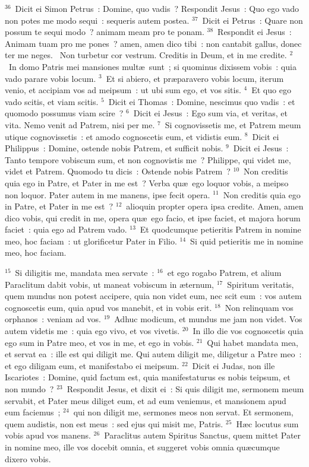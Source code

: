 ${}^{36}$~Dicit ei Simon Petrus~: Domine, quo vadis~? Respondit Jesus~: Quo ego vado non potes me modo sequi~: sequeris autem postea.
${}^{37}$~Dicit ei Petrus~: Quare non possum te sequi modo~? animam meam pro te ponam.
${}^{38}$~Respondit ei Jesus~: Animam tuam pro me pones~? amen, amen dico tibi~: non cantabit gallus, donec ter me neges.
~Non turbetur cor vestrum. Creditis in Deum, et in me credite.
${}^{2}$~In domo Patris mei mansiones mult\ae\ sunt~; si quominus dixissem vobis~: quia vado parare vobis locum.
${}^{3}$~Et si abiero, et pr\ae paravero vobis locum, iterum venio, et accipiam vos ad meipsum~: ut ubi sum ego, et vos sitis.
${}^{4}$~Et quo ego vado scitis, et viam scitis.
${}^{5}$~Dicit ei Thomas~: Domine, nescimus quo vadis~: et quomodo possumus viam scire~?
${}^{6}$~Dicit ei Jesus~: Ego sum via, et veritas, et vita. Nemo venit ad Patrem, nisi per me.
${}^{7}$~Si cognovissetis me, et Patrem meum utique cognovissetis~: et amodo cognoscetis eum, et vidistis eum.
${}^{8}$~Dicit ei Philippus~: Domine, ostende nobis Patrem, et sufficit nobis.
${}^{9}$~Dicit ei Jesus~: Tanto tempore vobiscum sum, et non cognovistis me~? Philippe, qui videt me, videt et Patrem. Quomodo tu dicis~: Ostende nobis Patrem~?
${}^{10}$~Non creditis quia ego in Patre, et Pater in me est~? Verba qu\ae\ ego loquor vobis, a meipso non loquor. Pater autem in me manens, ipse fecit opera.
${}^{11}$~Non creditis quia ego in Patre, et Pater in me est~?
${}^{12}$~alioquin propter opera ipsa credite. Amen, amen dico vobis, qui credit in me, opera qu\ae\ ego facio, et ipse faciet, et majora horum faciet~: quia ego ad Patrem vado.
${}^{13}$~Et quodcumque petieritis Patrem in nomine meo, hoc faciam~: ut glorificetur Pater in Filio.
${}^{14}$~Si quid petieritis me in nomine meo, hoc faciam.


${}^{15}$~Si diligitis me, mandata mea servate~:
${}^{16}$~et ego rogabo Patrem, et alium Paraclitum dabit vobis, ut maneat vobiscum in \ae ternum,
${}^{17}$~Spiritum veritatis, quem mundus non potest accipere, quia non videt eum, nec scit eum~: vos autem cognoscetis eum, quia apud vos manebit, et in vobis erit.
${}^{18}$~Non relinquam vos orphanos~: veniam ad vos.
${}^{19}$~Adhuc modicum, et mundus me jam non videt. Vos autem videtis me~: quia ego vivo, et vos vivetis.
${}^{20}$~In illo die vos cognoscetis quia ego sum in Patre meo, et vos in me, et ego in vobis.
${}^{21}$~Qui habet mandata mea, et servat ea~: ille est qui diligit me. Qui autem diligit me, diligetur a Patre meo~: et ego diligam eum, et manifestabo ei meipsum.
${}^{22}$~Dicit ei Judas, non ille Iscariotes~: Domine, quid factum est, quia manifestaturus es nobis teipsum, et non mundo~?
${}^{23}$~Respondit Jesus, et dixit ei~: Si quis diligit me, sermonem meum servabit, et Pater meus diliget eum, et ad eum veniemus, et mansionem apud eum faciemus~;
${}^{24}$~qui non diligit me, sermones meos non servat. Et sermonem, quem audistis, non est meus~: sed ejus qui misit me, Patris.
${}^{25}$~H\ae c locutus sum vobis apud vos manens.
${}^{26}$~Paraclitus autem Spiritus Sanctus, quem mittet Pater in nomine meo, ille vos docebit omnia, et suggeret vobis omnia qu\ae cumque dixero vobis.


